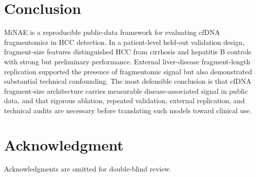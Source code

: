 \documentclass[conference]{IEEEtran}
\begin{document}
\section{Conclusion}
MiNAE is a reproducible public-data framework for evaluating cfDNA fragmentomics in HCC detection. In a patient-level held-out validation design, fragment-size features distinguished HCC from cirrhosis and hepatitis B controls with strong but preliminary performance. External liver-disease fragment-length replication supported the presence of fragmentomic signal but also demonstrated substantial technical confounding. The most defensible conclusion is that cfDNA fragment-size architecture carries measurable disease-associated signal in public data, and that rigorous ablation, repeated validation, external replication, and technical audits are necessary before translating such models toward clinical use.

\section*{Acknowledgment}
Acknowledgments are omitted for double-blind review.



\end{document}
